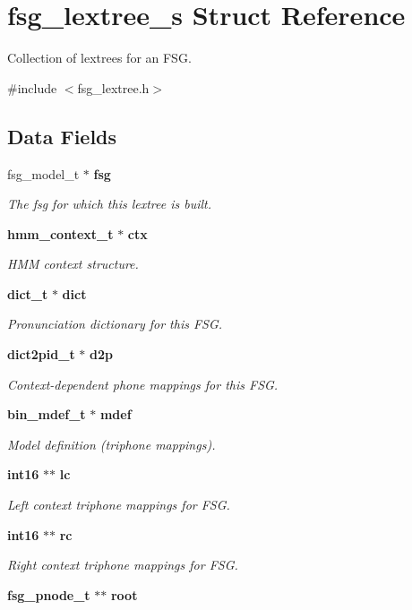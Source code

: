 \section{fsg\-\_\-lextree\-\_\-s \-Struct \-Reference}
\label{structfsg__lextree__s}


\-Collection of lextrees for an \-F\-S\-G.  




{\ttfamily \#include $<$fsg\-\_\-lextree.\-h$>$}

\subsection*{\-Data \-Fields}
\begin{DoxyCompactItemize}
\item 
fsg\-\_\-model\-\_\-t $\ast$ {\bf fsg}
\begin{DoxyCompactList}\small\item\em \-The fsg for which this lextree is built. \end{DoxyCompactList}\item 
{\bf hmm\-\_\-context\-\_\-t} $\ast$ {\bf ctx}
\begin{DoxyCompactList}\small\item\em \-H\-M\-M context structure. \end{DoxyCompactList}\item 
{\bf dict\-\_\-t} $\ast$ {\bf dict}
\begin{DoxyCompactList}\small\item\em \-Pronunciation dictionary for this \-F\-S\-G. \end{DoxyCompactList}\item 
{\bf dict2pid\-\_\-t} $\ast$ {\bf d2p}
\begin{DoxyCompactList}\small\item\em \-Context-\/dependent phone mappings for this \-F\-S\-G. \end{DoxyCompactList}\item 
{\bf bin\-\_\-mdef\-\_\-t} $\ast$ {\bf mdef}
\begin{DoxyCompactList}\small\item\em \-Model definition (triphone mappings). \end{DoxyCompactList}\item 
{\bf int16} $\ast$$\ast$ {\bf lc}
\begin{DoxyCompactList}\small\item\em \-Left context triphone mappings for \-F\-S\-G. \end{DoxyCompactList}\item 
{\bf int16} $\ast$$\ast$ {\bf rc}
\begin{DoxyCompactList}\small\item\em \-Right context triphone mappings for \-F\-S\-G. \end{DoxyCompactList}\item 
{\bf fsg\-\_\-pnode\-\_\-t} $\ast$$\ast$ {\bfseries root}\label{structfsg__lextree__s_a12e9668f7da3b84b0b36799a631fe8d3}


\end{DoxyCompactItemize}
